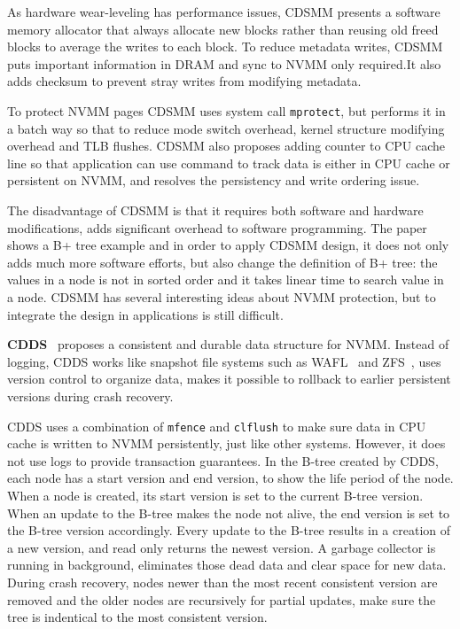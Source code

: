 As hardware wear-leveling has performance issues, CDSMM presents a
software memory allocator that always allocate new blocks rather than reusing
old freed blocks to average the writes to each block. To reduce metadata
writes, CDSMM puts important information in DRAM and sync to NVMM only required.It also adds checksum to prevent stray writes from modifying metadata.

To protect NVMM pages CDSMM uses system call \texttt{mprotect}, but performs
it in a batch way so that to reduce mode switch overhead, kernel structure
modifying overhead and TLB flushes. CDSMM also proposes adding counter to CPU
cache line so that application can use command to track data is either in 
CPU cache or persistent on NVMM, and resolves the persistency and write ordering
issue. 

The disadvantage of CDSMM is that it requires both software and hardware
modifications, adds significant overhead to software programming. The paper
shows a B+ tree example and in order to apply CDSMM design, it does not only 
adds much more software efforts, but also change the definition of B+ tree:
the values in a node is not in sorted order and it takes linear time to search
value in a node. CDSMM has several interesting ideas about NVMM protection, but
to integrate the design in applications is still difficult.

\textbf{CDDS}~\cite{cdds} proposes a consistent and durable data structure for
 NVMM.
Instead of logging, CDDS works like snapshot file systems such as
WAFL~\cite{wafl} and ZFS~\cite{zfs}, uses version control to organize data,
makes it possible to rollback to earlier persistent versions during crash
recovery.

CDDS uses a combination of \texttt{mfence} and \texttt{clflush} to make sure
data in CPU cache is written to NVMM persistently, just like other systems.
However, it does not use logs to provide transaction guarantees. In the B-tree
created by CDDS, each node has a start version and end version, to show the
life period of the node. When a node is created, its start version is set
to the current B-tree version. When an update to the B-tree makes the node
not alive, the end version is set to the B-tree version accordingly.
Every update to the B-tree results in a creation of
a new version, and read only returns the newest version. A garbage collector
is running in background, eliminates those dead data and clear space for
new data. During crash recovery, nodes newer than the most recent consistent
version are removed and the older nodes are recursively for partial updates,
make sure the tree is indentical to the most consistent version.

